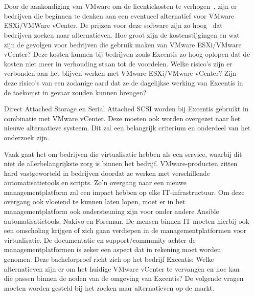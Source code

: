 
\chapter{}%
\label{ch:inleiding}

\section{}%
\label{sec:probleemstelling}

Door de aankondiging van VMware om de licentiekosten te verhogen~\autocite{device42_2024}, zijn er bedrijven die beginnen te denken aan een eventueel alternatief voor VMware ESXi/VMWare vCenter.
De prijzen voor deze software zijn zo hoog~\autocite{Hale2024} dat bedrijven zoeken naar alternatieven.
Hoe groot zijn de kostenstijgingen en wat zijn de gevolgen voor bedrijven die gebruik maken van VMware ESXi/VMware vCenter?
Deze kosten kunnen bij bedrijven zoals Excentis zo hoog oplopen dat de kosten niet meer in verhouding staan tot de voordelen.
Welke risico's zijn er verbonden aan het blijven werken met VMware ESXi/VMware vCenter?
Zijn deze risico’s van een zodanige aard dat ze de dagelijkse werking van Excentis in de toekomst in gevaar zouden kunnen brengen?

Direct Attached Storage en Serial Attached SCSI worden bij Excentis gebruikt in combinatie met VMware vCenter.
Deze moeten ook worden overgezet naar het nieuwe alternatieve systeem. Dit zal een belangrijk criterium en onderdeel van het onderzoek zijn.

Vaak gaat het om bedrijven die virtualisatie hebben als een service, waarbij dit niet de allerbelangrijkste zorg is binnen het bedrijf.
VMware-producten zitten hard vastgeworteld in bedrijven doordat ze werken met verschillende automatisatietools en scripts. Zo'n overgang naar een nieuwe managementplatform zal een impact hebben op elke IT-infrastructuur.
Om deze overgang ook vloeiend te kunnen laten lopen, moet er in het managementplatform ook ondersteuning zijn voor onder andere Ansible automatisatietools, Nakivo en Foreman.
De mensen binnen IT moeten hierbij ook een omscholing krijgen of zich gaan verdiepen in de managementplatformen  voor virtualisatie. De documentatie en support/community achter de managementplatformen is zeker een aspect dat in rekening moet worden genomen.
Deze bachelorproef richt zich op het bedrijf Excentis: Welke alternatieven zijn er om het huidige VMware vCenter te vervangen en hoe kan die passen binnen de noden van de omgeving van Excentis?
De volgende vragen moeten worden gesteld bij het zoeken naar alternatieven op de markt.


